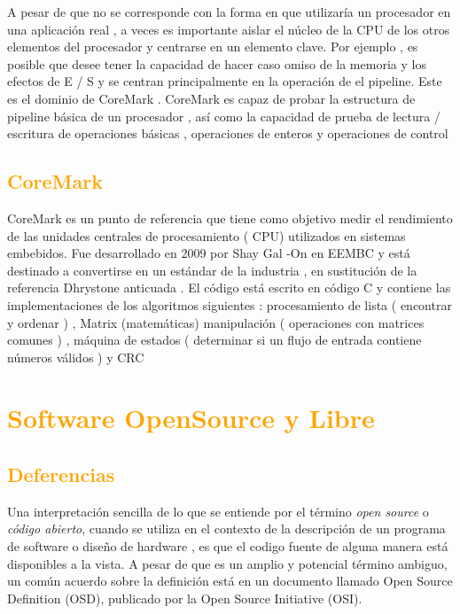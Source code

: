\documentclass[a4paper,11pt]{article}
\begin{document}
A pesar de que no se corresponde con la forma en que utilizaría un procesador en una aplicación real , a veces es importante aislar el núcleo de la CPU de los otros elementos del procesador y centrarse en un elemento clave. Por ejemplo , es posible que desee tener la capacidad de hacer caso omiso de la memoria y los efectos de E / S y se centran principalmente en la operación de el pipeline. Este es el dominio de CoreMark . CoreMark es capaz de probar la estructura de pipeline básica de un procesador , así como la capacidad de prueba de lectura / escritura de operaciones básicas , operaciones de enteros y operaciones de control

	\subsection{\textcolor{orange}{CoreMark}}

CoreMark es un punto de referencia que tiene como objetivo medir el rendimiento de las unidades centrales de procesamiento ( CPU) utilizados en sistemas embebidos. Fue desarrollado en 2009 por Shay Gal -On en EEMBC y está destinado a convertirse en un estándar de la industria , en sustitución de la referencia Dhrystone anticuada . El código está escrito en código C y contiene las implementaciones de los algoritmos siguientes : procesamiento de lista ( encontrar y ordenar ) , Matrix (matemáticas) manipulación ( operaciones con matrices comunes ) , máquina de estados ( determinar si un flujo de entrada contiene números válidos ) y CRC


\section{\textcolor{orange}{Software OpenSource y Libre}}%
		\subsection{\textcolor{orange}{Deferencias}}%
Una interpretación sencilla de lo que se entiende por el término \textit {open source} o \textit{código abierto}, cuando se utiliza en el contexto de la descripción de un programa de software o diseño de hardware , es que el codigo fuente  de alguna manera está disponibles a la vista. A pesar de que es un amplio y potencial término ambiguo, un común acuerdo sobre la definición está en un documento llamado  Open Source Definition (OSD), publicado por la Open Source Initiative (OSI).
\end{document}
